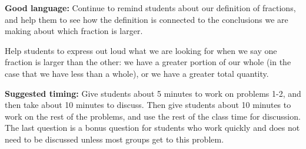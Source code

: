 \documentclass[nooutcomes,noauthor]{ximera}
\begin{document}
\begin{instructorNotes}
{\bf Good language:}  Continue to remind students about our definition of fractions, and help them to see how the definition is connected to the conclusions we are making about which fraction is larger.

Help students to express out loud what we are looking for when we say one fraction is larger than the other: we have a greater portion of our whole (in the case that we have less than a whole), or we have a greater total quantity.



{\bf Suggested timing:} Give students about 5 minutes to work on problems 1-2, and then take about 10 minutes to discuss. Then give students about 10 minutes to work on the rest of the problems, and use the rest of the class time for discussion. The last question is a bonus question for students who work quickly and does not need to be discussed unless most groups get to this problem.




\end{instructorNotes}
\end{document}
